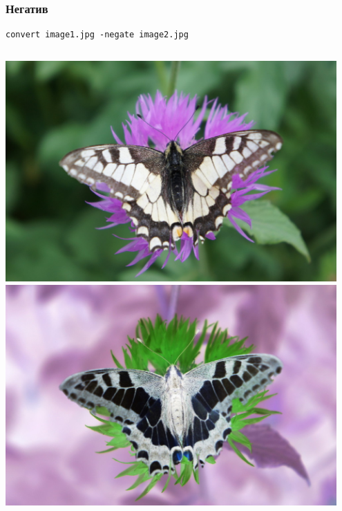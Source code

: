 \documentclass[11pt, compress]{beamer}
\begin{document}
\begin{frame}[c, fragile]
\frametitle{Негатив}
\begin{lstlisting}
convert image1.jpg -negate image2.jpg
\end{lstlisting}
\begin{columns}
\center
\includegraphics[width=0.95\textwidth]{FLY1000.jpg}
\center
\includegraphics[width=0.95\textwidth]{FLY_negate.jpg}
\end{columns}
\end{frame}
\end{document}
